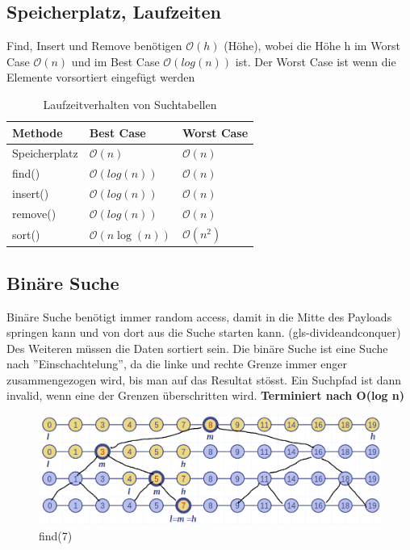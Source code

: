 \subsection{Speicherplatz, Laufzeiten}
Find, Insert und Remove benötigen $\mathcal{O}(h)$ (Höhe), wobei die Höhe h im Worst Case $\mathcal{O}(n)$ und im Best Case $\mathcal{O}(log(n))$ ist. Der Worst Case ist wenn die Elemente vorsortiert eingefügt werden
\begin{table}[h]
	\centering
	\begin{tabu} to \linewidth {l l l}
		\toprule
		Methode & Best Case  & Worst Case \\
		\midrule
		Speicherplatz & $\mathcal{O}(n)$ & $\mathcal{O}(n)$ \\
		find() & $\mathcal{O}(log(n))$ &  $\mathcal{O}(n)$ \\
		insert() & $\mathcal{O}(log(n))$ & $\mathcal{O}(n)$ \\
		remove() & $\mathcal{O}(log(n))$ & $\mathcal{O}(n)$ \\
		sort()  & $\mathcal{O}(n\log(n))$ & $\mathcal{O}(n^2)$ \\
		\bottomrule
	\end{tabu}
	\caption{Laufzeitverhalten von Suchtabellen}
\end{table}
\clearpage

\subsection{Binäre Suche}
Binäre Suche benötigt immer random access, damit in die Mitte des Payloads springen kann und von dort aus die Suche starten kann. (\gls{gls-divideandconquer}) Des Weiteren müssen die Daten sortiert sein. Die binäre Suche ist eine Suche nach ''Einschachtelung'', da die linke und rechte Grenze immer enger zusammengezogen wird, bis man auf das Resultat stösst. Ein Suchpfad ist dann invalid, wenn eine der Grenzen überschritten wird.
\textbf{Terminiert nach O(log n)}
\begin{figure}[ht!]
		\centering
		\begin{minipage}[t]{0.4\textwidth}
			\centering
			\includegraphics[width=1.2\linewidth]{images/binary_search}
			\caption{find(7)}
			\label{fig:binary search divide and conquer}
		\end{minipage}
	\end{figure}
\clearpage

